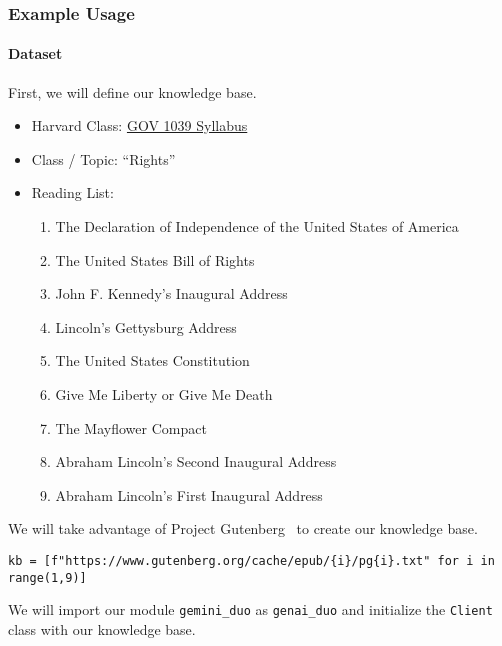 \subsubsection{Example Usage}

\paragraph{Dataset}

First, we will define our knowledge base. 

\begin{itemize}
\item Harvard Class: \href{https://scholar.harvard.edu/files/dlcammack/files/gov_1039_syllabus.pdf}{GOV 1039 Syllabus}
\item Class / Topic: ``Rights''
\item Reading List:
  \begin{enumerate}
  \item The Declaration of Independence of the United States of America
  \item The United States Bill of Rights  
  \item John F. Kennedy's Inaugural Address
  \item Lincoln's Gettysburg Address
  \item The United States Constitution
  \item Give Me Liberty or Give Me Death
  \item The Mayflower Compact
  \item Abraham Lincoln's Second Inaugural Address
  \item Abraham Lincoln's First Inaugural Address
  \end{enumerate}
\end{itemize}

We will take advantage of Project Gutenberg~ to create our knowledge base.

\begin{verbatim}
kb = [f"https://www.gutenberg.org/cache/epub/{i}/pg{i}.txt" for i in range(1,9)]
\end{verbatim}

We will import our module \texttt{gemini\_duo} as \texttt{genai\_duo} and initialize the \texttt{Client} class with our knowledge base.

